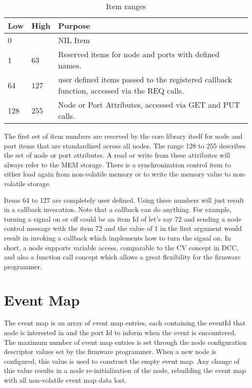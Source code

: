 \begin{table}[!ht]
    \begin{center}
        \begin{tabular}{|l|l|p{}|}
            \toprule
            \textbf{Low} & \textbf{High} & \textbf{Purpose} \\
            \midrule
            0 & & NIL Item \\
            \midrule
            1 & 63 & Reserved items for node and ports with defined names. \\
            \midrule
            64 & 127 & user defined items passed to the registered callback function, accessed via the REQ calls. \\
            \midrule
            128 & 255 & Node or Port Attributes, accessed via GET and PUT calls. \\
            \bottomrule
        \end{tabular}
    \end{center}
    \caption{Item ranges}
\end{table}
\FloatBarrier

The first set of item numbers are reserved by the core library itself for node and port items that are standardized across all nodes. The range 128 to 255 describes the set of node or port attributes. A read or write from these attributes will always refer to the MEM storage. There is a synchronization control item to either load again from non-volatile memory or to write the memory value to non-volatile storage.

Items 64 to 127 are completely user defined. Using these numbers will just result in a callback invocation. Note that a callback can do anything. For example, turning a signal on or off could be an item Id of let's say 72 and sending a node control message with the item 72 and the value of 1 in the first argument would result in invoking a callback which implements how to turn the signal on. In short, a node supports variable access, comparable to the CV concept in DCC, and also a function call concept which allows a great flexibility for the firmware programmer.

\section{Event Map}

The event map is an array of event map entries, each containing the eventId that node is interested in and the port Id to inform when the event is encountered. The maximum number of event map entries is set through the node configuration descriptor values set by the firmware programmer. When a new node is configured, this value is used to construct the empty event map. Any change of this value results in a node re-initialization of the node, rebuilding the event map with all non-volatile event map data lost.


